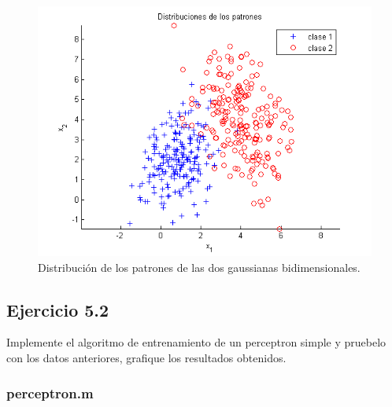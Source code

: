 \documentclass[11pt,a4paper,final]{article}
\begin{document}
\begin{figure}
\includegraphics [width=\textwidth]{Ejercicio5_01.png}
\caption{Distribución de los patrones de las dos gaussianas bidimensionales.}
\label{fig:ejercicio51}
\end{figure}



\subsection{Ejercicio 5.2}

Implemente el algoritmo de entrenamiento de un perceptron simple y pruebelo con los datos anteriores, grafique los resultados obtenidos.


\subsubsection*{perceptron.m}
\end{document}
